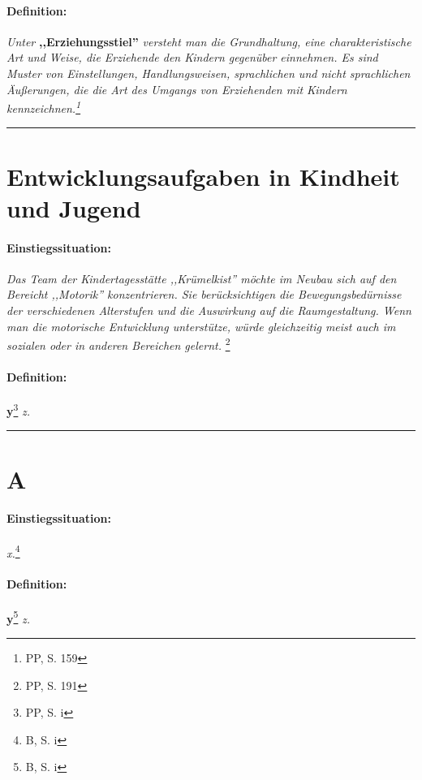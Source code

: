 \documentclass[12pt,a4paper]{article}
\newcommand\einstieg{\paragraph{\color{amethyst} {Einstiegssituation:}}}
\newcommand\definition{\paragraph{\color{red} {Definition:}}}
\begin{document}
\definition {\sl Unter} {\bf ,,Erziehungsstiel''}
\sl{versteht man die Grundhaltung, eine charakteristische Art und Weise, die
  Erziehende den Kindern gegenüber einnehmen. Es sind Muster von Einstellungen,
  Handlungsweisen, sprachlichen und nicht sprachlichen Äußerungen, die die Art
  des Umgangs von Erziehenden mit Kindern kennzeichnen.}\footnote{\label{Erziehungsstiel} PP, S. 159}

\vskip 16pt \hrule
\section{Entwicklungsaufgaben in Kindheit und Jugend}

\einstieg {\sl Das Team der Kindertagesstätte ,,Krümelkist'' möchte im Neubau
  sich auf den Bereicht ,,Motorik'' konzentrieren. Sie berücksichtigen die
  Bewegungsbedürnisse der verschiedenen Alterstufen und die Auswirkung auf die
  Raumgestaltung. Wenn man die motorische Entwicklung unterstütze, würde
  gleichzeitig meist auch im sozialen oder in anderen Bereichen gelernt. }\footnote{\label{F-K} PP, S. 191}

\definition {\bf y}\footnote{\label{y} PP, S. i}
 \sl{z.}


\vskip 16pt \hrule
\section{A}

\einstieg {\sl x.}\footnote{\label{F-x} B, S. i}

\definition {\bf y}\footnote{\label{y} B, S. i}
 \sl{z.}

\printindex
\end{document}
